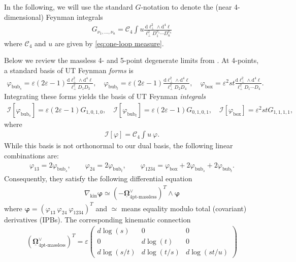 \documentclass[11pt]{article}
\renewcommand{\d}{\text{d}}
\newcommand{\C}{\mathcal{C}}
\newcommand{\vphi}{\varphi}
\newcommand{\vep}{\varepsilon}
\newcommand{\bs}[1]{\boldsymbol{#1}}
\newcommand{\mat}[1]{\underline{\boldsymbol{#1}}}
\begin{document}
In the following, we will use the standard $G$-notation to denote the (near 4-dimensional) Feynman integrals
\begin{align}
	G_{\nu_1,\dots,\nu_n} 
	= \C_4 \int  u
	\frac{
		\d\ell_\perp^2 \wedge \d^4\ell
	}{
		\ell_\perp^2 D_1^{\nu_1} \cdots D_n^{\nu_n}
	}
\end{align}
where $\C_4$ and $u$ are given by \eqref{eq:one-loop measure}. 

Below we review the massless 4- and 5-point degenerate limits from \cite{Caron-Huot:2021xqj}.
At 4-points, a standard basis of UT Feynman \emph{forms} is \cite{Henn:2014qga}
\begin{align}
	\vphi_{\text{bub}_{s}} = \vep (2\vep{-}1) 
	\frac{ \d\ell_\perp^2 \wedge \d^4\ell}{\ell_\perp^2 D_1 D_3},
	\quad
	\vphi_{\text{bub}_{t}} = \vep (2\vep{-}1)
	\frac{ \d\ell_\perp^2 \wedge \d^4\ell}{\ell_\perp^2 D_2 D_4},
	\quad
	\vphi_{\text{box}} = \vep^2 st 
	\frac{ \d\ell_\perp^2 \wedge \d^4\ell}{\ell_\perp^2 D_1 \cdots D_4}.
\end{align}
Integrating these forms yields the basis of UT Feynman \emph{integrals}
\begin{align}
	\mathscr{I}[\vphi_{\text{bub}_s}] = \vep (2\vep{-}1) G_{1,0,1,0},
	\quad 
	\mathscr{I}[\vphi_{\text{bub}_t}] = \vep (2\vep{-}1) G_{0,1,0,1},
	\quad 
	\mathscr{I}[\vphi_{\text{box}}] = \vep^2 st  G_{1,1,1,1},
\end{align}
where 
\begin{align}
	\mathscr{I}[\vphi] = \mathcal{C}_4 \int u\ \vphi.
\end{align}
While this basis is not orthonormal to our dual basis, the following linear combinations are:
\begin{align}
	\vphi_{13} = 2 \vphi_{\text{bub}_s},
	\qquad
	\vphi_{24} = 2 \vphi_{\text{bub}_t},
	\qquad
	\label{eq:4pt box}
	\vphi_{1234} =	\vphi_{\text{box}} + 2 \vphi_{\text{bub}_s} + 2 \vphi_{\text{bub}_t}. 
\end{align}
Consequently, they satisfy the following differential equation 
\begin{align} 
	\nabla_\text{kin} \bs{\vphi} \simeq (-\mat{\Omega}^\vee_{4\text{pt-massless}} )^T \wedge \bs{\vphi}
\end{align}
where $\bs{\vphi} = ( \vphi_{13}\ \vphi_{24}\ \vphi_{1234} )^T$ and $\simeq$ means equality modulo total (covariant) derivatives (IPBs). 
The corresponding kinematic connection 
\begin{align} \label{eq:4pt kinematic connection}
	(\mat{\Omega}^\vee_{4\text{pt-massless}})^T
	= \vep 
	\begin{pmatrix}
		d\log(s) & 0 & 0 \\
		0 & d\log(t) & 0 \\
	 	d\log(s/t) & d\log(t/s) & d\log(st/u)
	\end{pmatrix}
\end{align}
\end{document}
